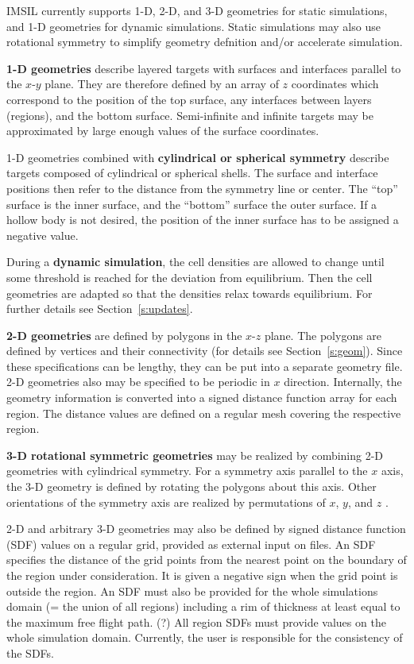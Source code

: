 IMSIL currently supports 1-D, 2-D, and 3-D geometries for
static simulations, and 1-D geometries for dynamic simulations. Static 
simulations may also use rotational symmetry to simplify geometry defnition
and/or accelerate simulation. 

\textbf{1-D geometries} describe layered targets with surfaces and interfaces
parallel to the $x$-$y$ plane. They are therefore defined by an array of $z$
coordinates which correspond to the position of the top surface, any
interfaces between layers (regions), and the bottom surface. Semi-infinite and
infinite targets may be approximated by large enough values of the surface
coordinates. 

1-D geometries combined with \textbf{cylindrical or spherical symmetry} describe
targets composed of cylindrical or spherical shells. The surface and interface
positions then refer to the distance from the symmetry line or center. The
``top'' surface is the inner surface, and the ``bottom'' surface the outer
surface. If a hollow body is not desired, the position of the inner surface has
to be assigned a negative value.

During a \textbf{dynamic simulation}, the cell densities are allowed to change
until some threshold is reached for the deviation from equilibrium. Then the
cell geometries are adapted so that the densities relax towards equilibrium. For
further details see Section~\ref{s:updates}.

\textbf{2-D geometries} are defined by polygons in the $x$-$z$ plane. The
polygons are defined by vertices and their connectivity (for details see
Section~\ref{s:geom}). Since these specifications can be lengthy, they can be
put into a separate geometry file. 2-D geometries also may be specified to be
periodic in $x$ direction. Internally, the geometry information is converted
into a signed distance function array for each region. The distance values are 
defined on a regular mesh covering the respective region.

\textbf{3-D rotational symmetric geometries} may be realized by combining 2-D
geometries with cylindrical symmetry. For a symmetry axis parallel to the $x$
axis, the 3-D geometry is defined by rotating the polygons about this axis.
Other orientations of the symmetry axis are realized by permutations of $x$,
$y$, and $z$ \cite{bradley_second_2021}.

2-D and arbitrary 3-D geometries may also be defined by signed distance function
(SDF) values on a regular grid, provided as external input on files. An SDF 
specifies the distance of the grid points from the nearest point on the
boundary of the region under consideration. It is given a negative sign
when the grid point is outside the region. An SDF must also be provided 
for the whole simulations domain (= the union of all regions) including a rim
of thickness at least equal to the maximum free flight path. (?) All region
SDFs must provide values on the whole simulation domain. Currently, 
the user is responsible for the consistency of the SDFs.

